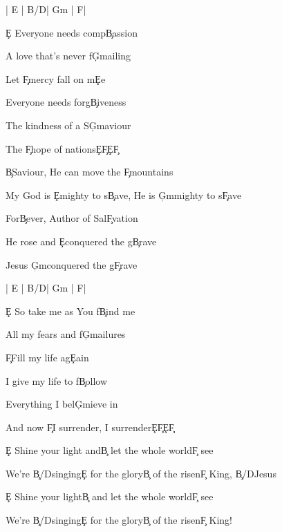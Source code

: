 \documentclass[9pt]{extarticle}
\begin{document}
\bsong

\bi
| E |  B/D\s   | G\s m | F\s  |
\ei

\bv
\c{E} Everyone needs comp\c{B}assion

A love that's never f\c{G\s m}ailing

Let \c{F\s }mercy fall on m\c{E}e

Everyone needs forg\c{B}iveness

The kindness of a S\c{G\s m}aviour

The \c{F\s }hope of nations\c{E}\c{F\s }\c{E}\c{F\s }
\ev

\bc
\c{B}Saviour, He can move the \c{F\s }mountains

My God is \c{E}mighty to s\c{B}ave, He is \c{G\s m}mighty to s\c{F\s }ave

For\c{B}ever, Author of Sal\c{F\s }vation

He rose and \c{E}conquered the g\c{B}rave

Jesus \c{G\s m}conquered the g\c{F\s }rave
\ec

\bin
| E |  B/D\s   | G\s m | F\s  |
\ein

\bv
\c{E} So take me as You f\c{B}ind me

All my fears and f\c{G\s m}ailures

\c{F\s }Fill my life ag\c{E}ain

I give my life to f\c{B}ollow

Everything I bel\c{G\s m}ieve in

And now \c{F\s }I surrender, I surrender\c{E}\c{F\s }\c{E}\c{F\s }
\ev


\bb[2]
\c{E} Shine your light and\c{B} let the whole world\c{F\s } see

We're \c{B/D\s }singing\c{E} for the glory\c{B} of the risen\c{F\s } King, \c{B/D\s }Jesus

\c{E} Shine your light\c{B} and let the whole world\c{F\s } see

We're \c{B/D\s }singing\c{E} for the glory\c{B} of the risen\c{F\s } King!
\eb



\esong
\end{document}
